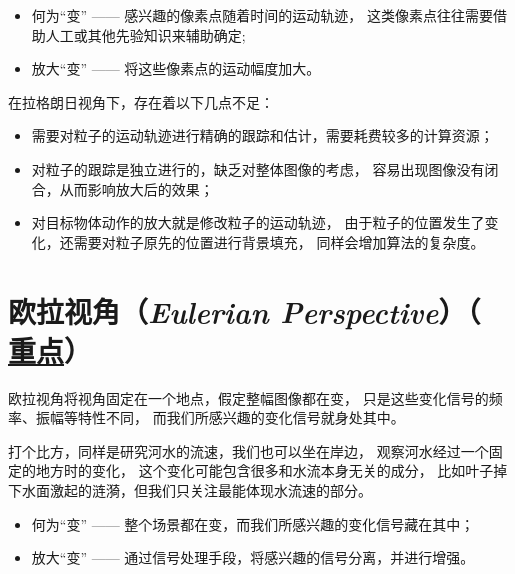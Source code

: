 \documentclass[AutoFakeBold]{MyFormat}
\begin{document}
\begin{itemize}
    \item 何为“变” —— 感兴趣的像素点随着时间的运动轨迹，
    这类像素点往往需要借助人工或其他先验知识来辅助确定;
    \item 放大“变” —— 将这些像素点的运动幅度加大。
\end{itemize}
\hspace*{\fill}
\par 在拉格朗日视角下，存在着以下几点不足：
\begin{itemize}
    \item 需要对粒子的运动轨迹进行精确的跟踪和估计，需要耗费较多的计算资源；
    \item 对粒子的跟踪是独立进行的，缺乏对整体图像的考虑，
    容易出现图像没有闭合，从而影响放大后的效果；
    \item 对目标物体动作的放大就是修改粒子的运动轨迹，
    由于粒子的位置发生了变化，还需要对粒子原先的位置进行背景填充，
    同样会增加算法的复杂度。
\end{itemize}



\section{欧拉视角（\textit{Eulerian Perspective}）（
\textbf{\Large \underline{重点}}）}
\par 欧拉视角将视角固定在一个地点，假定整幅图像都在变，
只是这些变化信号的频率、振幅等特性不同，
而我们所感兴趣的变化信号就身处其中。
\par 打个比方，同样是研究河水的流速，我们也可以坐在岸边，
观察河水经过一个固定的地方时的变化，
这个变化可能包含很多和水流本身无关的成分，
比如叶子掉下水面激起的涟漪，但我们只关注最能体现水流速的部分。
\begin{itemize}
    \item 何为“变” —— 整个场景都在变，而我们所感兴趣的变化信号藏在其中；
    \item 放大“变” —— 通过信号处理手段，将感兴趣的信号分离，并进行增强。\\
\end{itemize}
\end{document}
